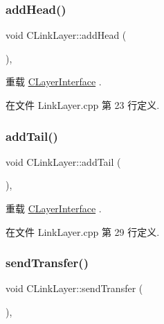 \subsubsection{\texorpdfstring{add\+Head()}{addHead()}}
{\footnotesize\ttfamily void C\+Link\+Layer\+::add\+Head (\begin{DoxyParamCaption}{ }\end{DoxyParamCaption})\hspace{0.3cm}{\ttfamily [protected]}, {\ttfamily [virtual]}}



重载 \hyperlink{class_c_layer_interface_ac38c51660960657ac42e37a19ea062b4}{C\+Layer\+Interface} .



在文件 Link\+Layer.\+cpp 第 23 行定义.

\mbox{\label{class_c_link_layer_a0962e4887e1893721031309a1e49a638}} 
\subsubsection{\texorpdfstring{add\+Tail()}{addTail()}}
{\footnotesize\ttfamily void C\+Link\+Layer\+::add\+Tail (\begin{DoxyParamCaption}{ }\end{DoxyParamCaption})\hspace{0.3cm}{\ttfamily [protected]}, {\ttfamily [virtual]}}



重载 \hyperlink{class_c_layer_interface_a433a6f3322355291bbfc2b97343d493f}{C\+Layer\+Interface} .



在文件 Link\+Layer.\+cpp 第 29 行定义.

\mbox{\label{class_c_link_layer_ab6a4124af45069fefeddff784ea26e3f}} 
\subsubsection{\texorpdfstring{send\+Transfer()}{sendTransfer()}}
{\footnotesize\ttfamily void C\+Link\+Layer\+::send\+Transfer (\begin{DoxyParamCaption}{ }\end{DoxyParamCaption})\hspace{0.3cm}{\ttfamily [protected]}, {\ttfamily [virtual]}}



